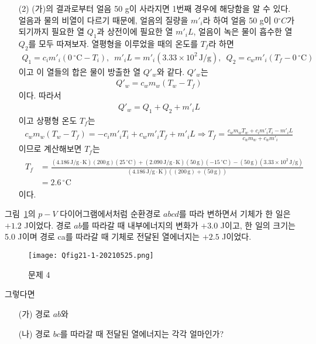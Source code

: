 \documentclass[floatfix,nofootinbib,superscriptaddress,fleqn]{revtex4-2}
\begin{document}
\begin{itemize}
  \item[(2)] 
  (가)의 결과로부터 얼음 50 g이 사라지면 1번째 경우에 해당함을 알 수 있다. 얼음과
  물의 비열이 다르기 때문에, 얼음의 질량을 $m'_i$라 하여
  얼음 50 g이 0$^\circ C$가 되기까지 필요한 열 $Q_1$과 
  상전이에 필요한 열 $m'_iL$, 얼음이 녹은 물이 흡수한 열 $Q_2$를 모두 따져보자.
  열평형을 이루었을 때의 온도를 $T_f$라 하면
  \begin{align}
    Q_1 = c_i m'_i (0\,\mathrm{^\circ C} - T_i),\,\,\,
    m'_i L = m'_i(3.33\times10^2\,\mathrm{J/g}),\,\,\,
    Q_2 = c_w m'_i (T_f - 0\,\mathrm{^\circ C})
  \end{align} 
  이고 이 열들의 합은 물이 방출한 열 $Q'_w$와 같다. $Q'_w$는
  \begin{align}
    Q'_w = c_w m_w (T_w - T_f)
  \end{align}
  이다. 따라서
  \begin{align}
    Q'_w = Q_1+Q_2+m'_i L
  \end{align}
  이고 상평형 온도 $T_f$는
  \begin{align}
    c_w m_w (T_w - T_f) = -c_i m'_i T_i +c_w m'_i T_f + m'_i L
    \Longrightarrow
    T_f = \frac{c_w m_w T_w+c_i m'_i T_i-m'_i L}{c_w m_w+c_w m'_i}
  \end{align}
  이므로 계산해보면 $T_f$는
  \begin{align}
    \begin{split}
      T_f &= \frac{(4.186\,\mathrm{J/g\cdot K}) (200\,\mathrm{g}) 
      (25\,\mathrm{^\circ C})+(2.090\,\mathrm{J/g\cdot K}) (50\,\mathrm{g}) 
      (-15\,\mathrm{^\circ C})-(50\,\mathrm{g}) 
      (3.33\times10^2\,\mathrm{J/g})}
      {(4.186\,\mathrm{J/g\cdot K}) ((200\,\mathrm{g})+ (50\,\mathrm{g}))}  \\
      &= 2.6\,\mathrm{^\circ C}
    \end{split}
  \end{align}
  이다.
\end{itemize}
\vspace{1.cm}
그림~\ref{fig:1}의 $p-V$
다이어그램에서처럼 순환경로 $abcd$를 따라 변하면서 기체가 한 일은
$+1.2$ J이었다. 경로 $ab$를 따라갈 때 내부에너지의 변화가 $+3.0$
J이고, 한 일의 크기는 5.0 J이며 경로 ca를 따라갈 때 기체로 전달된
열에너지는 $+2.5$ J이었다. 
\begin{figure}[ht]
  \centering
\texttt{[image: Qfig21-1-20210525.png]}
  \caption{문제 4}
  \label{fig:1}
\end{figure}
그렇다면
\begin{itemize}
\item[(가)] 경로 $ab$와
\item[(나)] 경로 $bc$를 따라갈 때 전달된 열에너지는 각각 얼마인가? 
\end{itemize}
\end{document}
